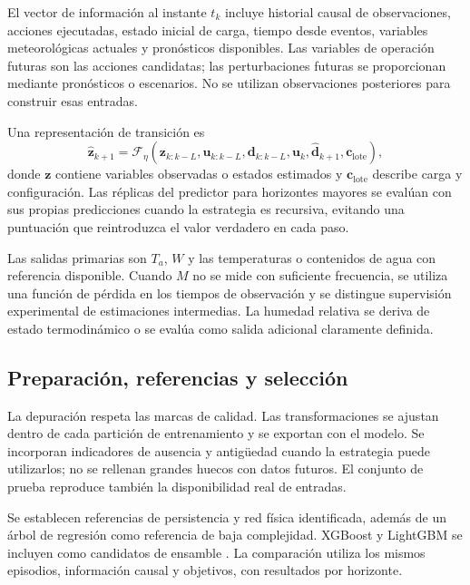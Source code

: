El vector de información al instante $t_k$ incluye historial causal de observaciones, acciones ejecutadas, estado inicial de carga, tiempo desde eventos, variables meteorológicas actuales y pronósticos disponibles. Las variables de operación futuras son las acciones candidatas; las perturbaciones futuras se proporcionan mediante pronósticos o escenarios. No se utilizan observaciones posteriores para construir esas entradas.

Una representación de transición es
\begin{equation}
\widehat{\mathbf z}_{k+1}
=\mathcal F_\eta\left(
\mathbf z_{k:k-L},\mathbf u_{k:k-L},
\mathbf d_{k:k-L},\mathbf u_k,\widehat{\mathbf d}_{k+1},
\mathbf c_{\mathrm{lote}}
\right),
\label{met:predictor_dinamico}
\end{equation}
donde $\mathbf z$ contiene variables observadas o estados estimados y $\mathbf c_{\mathrm{lote}}$ describe carga y configuración. Las réplicas del predictor para horizontes mayores se evalúan con sus propias predicciones cuando la estrategia es recursiva, evitando una puntuación que reintroduzca el valor verdadero en cada paso.

Las salidas primarias son $T_a$, $W$ y las temperaturas o contenidos de agua con referencia disponible. Cuando $M$ no se mide con suficiente frecuencia, se utiliza una función de pérdida en los tiempos de observación y se distingue supervisión experimental de estimaciones intermedias. La humedad relativa se deriva de estado termodinámico o se evalúa como salida adicional claramente definida.

\subsection{Preparación, referencias y selección}

La depuración respeta las marcas de calidad. Las transformaciones se ajustan dentro de cada partición de entrenamiento y se exportan con el modelo. Se incorporan indicadores de ausencia y antigüedad cuando la estrategia puede utilizarlos; no se rellenan grandes huecos con datos futuros. El conjunto de prueba reproduce también la disponibilidad real de entradas.

Se establecen referencias de persistencia y red física identificada, además de un árbol de regresión como referencia de baja complejidad. XGBoost y LightGBM se incluyen como candidatos de ensamble \cite{friedman2001,chen2016,ke2017}. La comparación utiliza los mismos episodios, información causal y objetivos, con resultados por horizonte.

